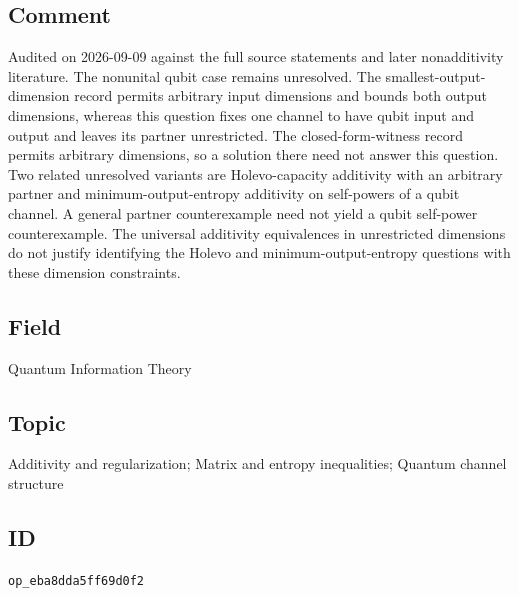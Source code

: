 \subsection*{Comment}

Audited on 2026-09-09 against the full source statements and later nonadditivity literature. The nonunital qubit case remains unresolved. The smallest-output-dimension record permits arbitrary input dimensions and bounds both output dimensions, whereas this question fixes one channel to have qubit input and output and leaves its partner unrestricted. The closed-form-witness record permits arbitrary dimensions, so a solution there need not answer this question. Two related unresolved variants are Holevo-capacity additivity with an arbitrary partner and minimum-output-entropy additivity on self-powers of a qubit channel. A general partner counterexample need not yield a qubit self-power counterexample. The universal additivity equivalences in unrestricted dimensions do not justify identifying the Holevo and minimum-output-entropy questions with these dimension constraints.

\subsection*{Field}

Quantum Information Theory

\subsection*{Topic}

Additivity and regularization; Matrix and entropy inequalities; Quantum channel structure

\subsection*{ID}

\texttt{op\_eba8dda5ff69d0f2}
